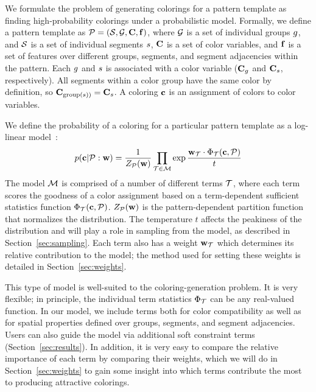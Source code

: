 
We formulate the problem of generating colorings for a pattern template as finding high-probability colorings under a probabilistic model. Formally, we define a pattern template as $\mathcal{P} = (\mathcal{S}, \mathcal{G}, \mathbf{C}, \mathbf{f})$, where $\mathcal{G}$ is a set of individual groups $g$, and $\mathcal{S}$ is a set of individual segments $s$, $\mathbf{C}$ is a set of color variables, and $\mathbf{f}$ is a set of features over different groups, segments, and segment adjacencies within the pattern. Each $g$ and $s$ is associated with a color variable ($\mathbf{C}_g$ and $\mathbf{C}_s$, respectively). All segments within a color group have the same color by definition, so $\mathbf{C}_{\text{group}(s))} = \mathbf{C}_s$. A coloring $\mathbf{c}$ is an assignment of colors to color variables.

We define the probability of a coloring for a particular pattern template as a log-linear model~\cite{LogLinearModels}:  
\begin{equation*}
 p(\mathbf{c} | \mathcal{P} : \mathbf{w}) = \frac{1}{Z_{\mathcal{P}}(\mathbf{w})} \prod_{\mathcal{T} \in \mathcal{M}} \exp{\frac{ \mathbf{w}_{\mathcal{T}}\cdot \Phi_{\mathcal{T}}(\mathbf{c}, \mathcal{P})}{t}}
\end{equation*}
The model $\mathcal{M}$ is comprised of a number of different terms $\mathcal{T}$, where each term scores the goodness of a color assignment based on a term-dependent sufficient statistics function $\Phi_{\mathcal{T}}(\mathbf{c},\mathcal{P})$. $Z_{\mathcal{P}}(\mathbf{w})$ is the pattern-dependent partition function that normalizes the distribution. The temperature $t$ affects the peakiness of the distribution and will play a role in sampling from the model, as described in Section~\ref{sec:sampling}. Each term also has a weight $\mathbf{w}_{\mathcal{T}}$ which determines its relative contribution to the model; the method used for setting these weights is detailed in Section~\ref{sec:weights}.

This type of model is well-suited to the coloring-generation problem. It is very flexible; in principle, the individual term statistics $\Phi_{\mathcal{T}}$ can be any real-valued function. In our model, we include terms both for color compatibility as well as for spatial properties defined over groups, segments, and segment adjacencies. Users can also guide the model via additional soft constraint terms (Section~\ref{sec:results}). In addition, it is very easy to compare the relative importance of each term by comparing their weights, which we will do in Section~\ref{sec:weights} to gain some insight into which terms contribute the most to producing attractive colorings. 

